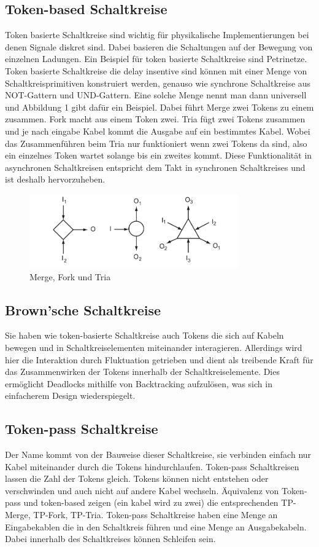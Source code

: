 \documentclass[11pt,a4paper]{article}
\begin{document}
\subsection{Token-based Schaltkreise}
Token basierte Schaltkreise sind wichtig für physikalische Implementierungen
bei denen Signale diskret sind.
%
Dabei basieren die Schaltungen auf der Bewegung
von einzelnen Ladungen. 
%
Ein Beispiel für token basierte Schaltkreise sind Petrinetze. 
%
Token basierte Schaltkreise die delay insentive sind können mit 
einer Menge von Schaltkreisprimitiven konstruiert werden, genauso 
wie synchrone Schaltkreise aus NOT-Gattern und UND-Gattern.
%
Eine solche Menge nennt man dann universell und Abbildung 1 gibt 
dafür ein Beispiel.
%
Dabei führt Merge zwei Tokens zu einem zusammen.
% 
Fork macht aus einem Token zwei.
%
Tria fügt zwei Tokens zusammen und je nach eingabe Kabel kommt
die Ausgabe auf ein bestimmtes Kabel.
%
Wobei das Zusammenführen beim Tria nur funktioniert wenn zwei Tokens da sind,
also ein einzelnes Token wartet solange bis ein zweites kommt.
%
Diese Funktionalität in asynchronen Schaltkreisen entspricht dem Takt in
synchronen Schaltkreises und ist deshalb hervorzuheben.
%

\begin{figure}[h]
       \centering
       \includegraphics[width=9cm]{bilder/tokenBased.png}
       \caption{Merge, Fork und Tria}
\end{figure}    

%

\subsection{Brown'sche Schaltkreise}
Sie haben wie token-basierte Schaltkreise auch Tokens die sich auf Kabeln 
bewegen und in Schaltkreiselementen miteinander interagieren.
%
Allerdings wird hier die Interaktion durch Fluktuation getrieben und dient
als treibende Kraft für das Zusammenwirken der Tokens innerhalb der
Schaltkreiselemente. 
%
Dies ermöglicht Deadlocks mithilfe 
von Backtracking aufzulösen, was sich in einfacherem Design wiederspiegelt.


\subsection{Token-pass Schaltkreise}
Der Name kommt von der Bauweise dieser Schaltkreise, sie verbinden einfach nur
Kabel miteinander durch die Tokens hindurchlaufen.
%
Token-pass Schaltkreisen lassen die Zahl der Tokens gleich.
%
Tokens können nicht entstehen oder verschwinden und auch 
nicht auf andere Kabel wechseln.
%
Äquivalenz von Token-pass und token-based zeigen (ein kabel wird zu zwei)
die entsprechenden TP-Merge, TP-Fork, TP-Tria.
%
Token-pass Schaltkreise haben eine Menge an Eingabekablen die in
den Schaltkreis führen und eine Menge an Ausgabekabeln.
%
Dabei innerhalb des Schaltkreises können Schleifen sein. 
%
\end{document}

